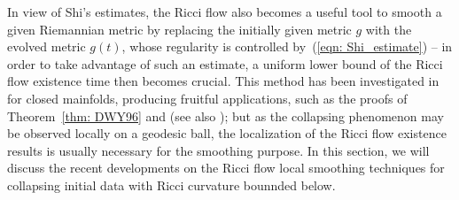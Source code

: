 \documentclass[pdftex]{sigma}
\numberwithin{equation}{section}
\begin{document}
In view of Shi's estimates, the Ricci flow also becomes a useful tool to smooth
a given Riemannian metric by replacing the initially given metric $g$ with the
evolved metric $g(t)$, whose regularity is controlled by~(\ref{eqn:
Shi_estimate}) -- in order to take advantage of such an estimate, a uniform
lower bound of the Ricci flow existence time then becomes crucial. This method
has been investigated in \cite{DWY96} for closed mainfolds, producing fruitful
applications, such as the proofs of Theorem~\ref{thm: DWY96} and
\cite[Proposition 6.6]{NaberZhang} (see also \cite{PWY99}); but as the
collapsing phenomenon may be observed locally on a geodesic ball, the
localization of the Ricci flow existence results is usually necessary for the
smoothing purpose. In this section, we will discuss the recent developments on
the Ricci flow local smoothing techniques for collapsing initial data with
Ricci curvature bounnded below.
\end{document}
